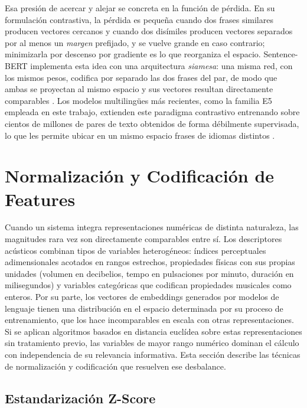 Esa presión de acercar y alejar se concreta en la función de pérdida. En su formulación contrastiva, la pérdida es pequeña cuando dos frases similares producen vectores cercanos y cuando dos disímiles producen vectores separados por al menos un \textit{margen} prefijado, y se vuelve grande en caso contrario; minimizarla por descenso por gradiente es lo que reorganiza el espacio. Sentence-BERT implementa esta idea con una arquitectura \textit{siamesa}: una misma red, con los mismos pesos, codifica por separado las dos frases del par, de modo que ambas se proyectan al mismo espacio y sus vectores resultan directamente comparables \parencite{reimers_2019_sentencebert}. Los modelos multilingües más recientes, como la familia E5 empleada en este trabajo, extienden este paradigma contrastivo entrenando sobre cientos de millones de pares de texto obtenidos de forma débilmente supervisada, lo que les permite ubicar en un mismo espacio frases de idiomas distintos \parencite{wang_2022_e5}.

\section{Normalización y Codificación de Features}
\label{sec:normalizacion-teoria}

Cuando un sistema integra representaciones numéricas de distinta naturaleza, las magnitudes rara vez son directamente comparables entre sí. Los descriptores acústicos combinan tipos de variables heterogéneos: índices perceptuales adimensionales acotados en rangos estrechos, propiedades físicas con sus propias unidades (volumen en decibelios, tempo en pulsaciones por minuto, duración en milisegundos) y variables categóricas que codifican propiedades musicales como enteros. Por su parte, los vectores de embeddings generados por modelos de lenguaje tienen una distribución en el espacio determinada por su proceso de entrenamiento, que los hace incomparables en escala con otras representaciones. Si se aplican algoritmos basados en distancia euclídea sobre estas representaciones sin tratamiento previo, las variables de mayor rango numérico dominan el cálculo con independencia de su relevancia informativa. Esta sección describe las técnicas de normalización y codificación que resuelven ese desbalance.

\subsection{Estandarización Z-Score}
\label{subsec:zscore-teoria}

